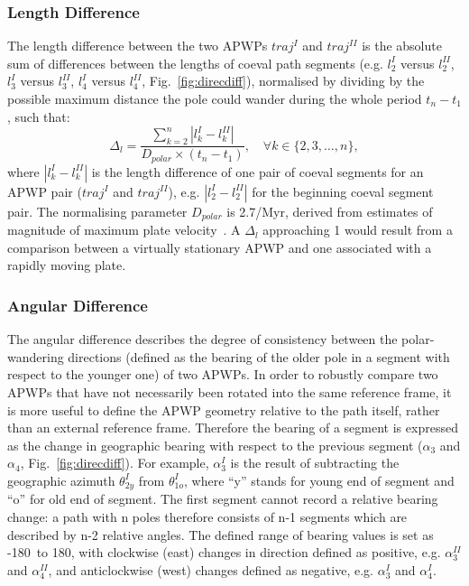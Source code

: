 \subsubsection{Length Difference}
The length difference between the two APWPs $traj^I$ and $traj^{II}$ is the
absolute sum of differences between the lengths of coeval path segments (e.g.
$l_2^I$ versus $l_2^{II}$, $l_3^I$ versus $l_3^{II}$, $l_4^I$ versus $l_4^{II}$,
Fig.~\ref{fig:direcdiff}), normalised by dividing by the possible maximum
distance the pole could wander during the whole period $t_n-t_1$, such that:
%
\begin{equation*}
  \Delta_l = \frac{\sum\limits_{k=2}^n | l_k^I - l_k^{II} |}{D_{polar}\times(t_n-t_1)} ,
  \quad\forall k \in \{2,3,\ldots,n\},
\label{eq:ld}
\end{equation*}
%
where $|l_k^I - l_k^{II}|$ is the length difference of one pair of coeval
segments for an APWP pair ($traj^I$ and $traj^{II}$), e.g. $|l_2^I - l_2^{II}|$
for the beginning coeval segment pair. The normalising parameter $D_{polar}$ is
2.7\degree/Myr, derived from estimates of magnitude of maximum plate
velocity~\cite[up to about 30 cm/year]{S09,K14}. A $\Delta_l$ approaching 1
would result from a comparison between a virtually stationary APWP and one
associated with a rapidly moving plate.

\subsubsection{Angular Difference}

The angular difference describes the degree of consistency between the
polar-wandering directions (defined as the bearing of the older pole in a
segment with respect to the younger one) of two APWPs. In order to robustly
compare two APWPs that have not necessarily been rotated into the same reference
frame, it is more useful to define the APWP geometry relative to the path
itself, rather than an external reference frame. Therefore the bearing of a
segment is expressed as the change in geographic bearing with respect to the
previous segment ($\alpha_3$ and $\alpha_4$, Fig.~\ref{fig:direcdiff}). For
example, $\alpha_3^I$ is the result of subtracting the geographic azimuth
$\theta_{2y}^I$ from $\theta_{1o}^I$, where ``y'' stands for young end of
segment and ``o'' for old end of segment. The first segment cannot record a
relative bearing change: a path with n poles therefore consists of n-1 segments
which are described by n-2 relative angles. The defined range of bearing values
is set as -180\degree\ to 180\degree, with clockwise (east) changes in direction
defined as positive, e.g. {\bf $\alpha_3^{II}$} and {\bf $\alpha_4^{II}$}, and
anticlockwise (west) changes defined as negative, e.g. {\bf $\alpha_3^I$} and
{\bf $\alpha_4^I$}.


